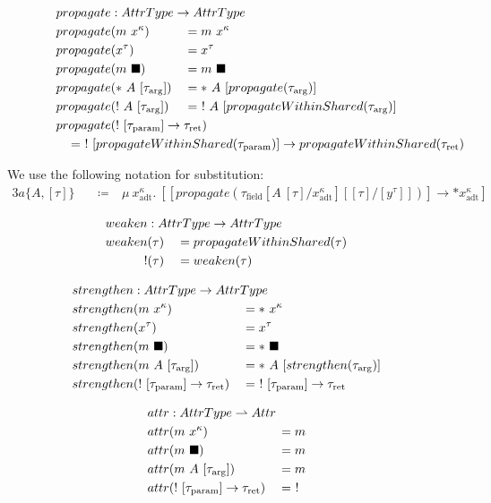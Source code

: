 \begin{alignat*}{3}
  propagate &: \mathrlap{AttrType \to AttrType} \\
  propagate&(m\ x^\kappa) &&= m\ x^\kappa \\
  propagate&(x^\tau) &&= x^\tau \\
  propagate&(m\ \blacksquare) &&= m\ \blacksquare \\
  propagate&(*\ A\ [\tau_\text{arg}]) &&= *\ A\ [propagate(\tau_\text{arg})] \\
  propagate&(!\ A\ [\tau_\text{arg}]) &&= \ !\ A\ [propagateWithinShared(\tau_\text{arg})] \\
  propagate&\mathrlap{(!\ [\tau_\text{param}] \to \tau_\text{ret})} \\
  \mathclap{\hspace{25em}= \ !\ [propagateWithinShared(\tau_\text{param})] \to propagateWithinShared(\tau_\text{ret})}
\end{alignat*}

We use the following notation for substitution:
\begin{alignat*}{3}
  a\{A, [\tau]\}\ &&\coloneqq&\ \mu\ x^\kappa_\text{adt}.\ [[propagate(\tau_\text{field}[A\ [\tau]/x^\kappa_\text{adt}][[\tau]/[y^\tau]])] \to *x^\kappa_\text{adt}]
\end{alignat*}


\begin{alignat*}{3}
  weaken &: \mathrlap{AttrType \to AttrType} \\
  weaken&(\tau) &&= propagateWithinShared(\tau) \\
  !&(\tau) &&= weaken(\tau)
\end{alignat*}

\begin{alignat*}{3}
  strengthen &: \mathrlap{AttrType \to AttrType} \\
  strengthen&(m\ x^\kappa) &&= *\ x^\kappa \\
  strengthen&(x^\tau) &&= x^\tau \\
  strengthen&(m\ \blacksquare) &&= *\ \blacksquare \\
  strengthen&(m\ A\ [\tau_\text{arg}]) &&= *\ A\ [strengthen(\tau_\text{arg})] \\
  strengthen&(!\ [\tau_\text{param}] \to \tau_\text{ret}) &&=\ !\ [\tau_\text{param}] \to \tau_\text{ret} \\
\end{alignat*}

\begin{alignat*}{3}
  attr &: \mathrlap{AttrType \rightharpoonup Attr} \\
  attr&(m\ x^\kappa) &&= m \\
  attr&(m\ \blacksquare) &&= m \\
  attr&(m\ A\ [\tau_\text{arg}]) &&= m \\
  attr&(!\ [\tau_\text{param}] \to \tau_\text{ret}) &&=\ ! \\
\end{alignat*}

